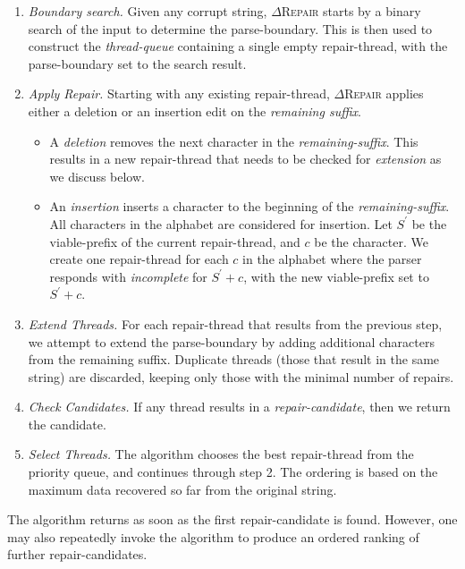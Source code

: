 \documentclass[acmsmall,screen,review,anonymous]{acmart}
\newcommand{\approach}{\textsc{$\Delta$Repair}\xspace}
\newcommand{\drepair}{\approach}
\begin{document}
\begin{enumerate}
\item \emph{Boundary search.} Given any corrupt string, \drepair starts by a
binary search of the input to determine the parse-boundary. This is then used
to construct the \emph{thread-queue} containing a single empty repair-thread,
with the parse-boundary set to the search result.

\item \emph{Apply Repair.} Starting with any existing repair-thread, \drepair applies
either a deletion or an insertion edit on the \emph{remaining suffix}.
\begin{itemize}
\item A \emph{deletion} removes the next character in the \emph{remaining-suffix}.
This results in a new repair-thread that needs to be checked for \emph{extension} as we discuss below.
\item An \emph{insertion} inserts a character to the beginning of the \emph{remaining-suffix}.
All characters in the alphabet are considered for insertion.
Let $S^{'}$ be the viable-prefix of the current repair-thread, and $c$ be the character.
We create one repair-thread for each $c$ in the alphabet where the parser
responds with \emph{incomplete} for $S^{'}+c$, with the new viable-prefix set to $S^{'}+c$.
\end{itemize}
\item \emph{Extend Threads.} For each repair-thread that results from the previous step,
we attempt to extend the parse-boundary by adding additional characters from the
remaining suffix. Duplicate threads (those that result in the same string) are discarded,
keeping only those with the minimal number of repairs.
\item \emph{Check Candidates.} If any thread results in a
\emph{repair-candidate}, then we return the candidate.
\item \emph{Select Threads.} The algorithm chooses the best repair-thread from the priority queue,
and continues through step 2. The ordering is based on the maximum data recovered so far from the original string.
\end{enumerate}

The algorithm returns as soon as the first repair-candidate is found.
However, one may also repeatedly invoke the algorithm to produce an ordered
ranking of further repair-candidates.
\end{document}
